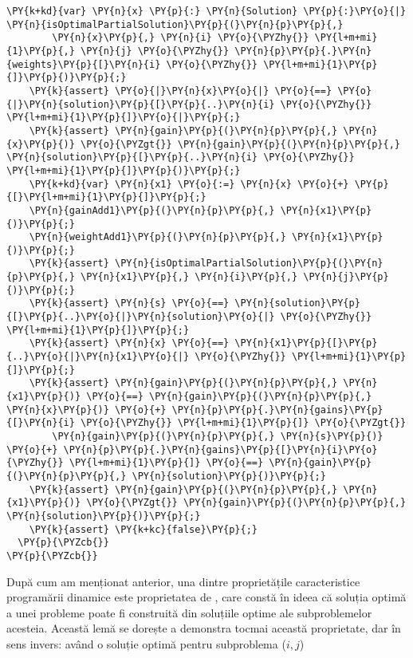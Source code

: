 \begin{sloppypar}
\begin{enumerate}
\begin{Verbatim}[commandchars=\\\{\}]
    \PY{k+kd}{var} \PY{n}{x} \PY{p}{:} \PY{n}{Solution} \PY{p}{:}\PY{o}{|} \PY{n}{isOptimalPartialSolution}\PY{p}{(}\PY{n}{p}\PY{p}{,} 
        \PY{n}{x}\PY{p}{,} \PY{n}{i} \PY{o}{\PYZhy{}} \PY{l+m+mi}{1}\PY{p}{,} \PY{n}{j} \PY{o}{\PYZhy{}} \PY{n}{p}\PY{p}{.}\PY{n}{weights}\PY{p}{[}\PY{n}{i} \PY{o}{\PYZhy{}} \PY{l+m+mi}{1}\PY{p}{]}\PY{p}{)}\PY{p}{;}
    \PY{k}{assert} \PY{o}{|}\PY{n}{x}\PY{o}{|} \PY{o}{==} \PY{o}{|}\PY{n}{solution}\PY{p}{[}\PY{p}{..}\PY{n}{i} \PY{o}{\PYZhy{}} \PY{l+m+mi}{1}\PY{p}{]}\PY{o}{|}\PY{p}{;}
    \PY{k}{assert} \PY{n}{gain}\PY{p}{(}\PY{n}{p}\PY{p}{,} \PY{n}{x}\PY{p}{)} \PY{o}{\PYZgt{}} \PY{n}{gain}\PY{p}{(}\PY{n}{p}\PY{p}{,} \PY{n}{solution}\PY{p}{[}\PY{p}{..}\PY{n}{i} \PY{o}{\PYZhy{}} \PY{l+m+mi}{1}\PY{p}{]}\PY{p}{)}\PY{p}{;}
    \PY{k+kd}{var} \PY{n}{x1} \PY{o}{:=} \PY{n}{x} \PY{o}{+} \PY{p}{[}\PY{l+m+mi}{1}\PY{p}{]}\PY{p}{;}
    \PY{n}{gainAdd1}\PY{p}{(}\PY{n}{p}\PY{p}{,} \PY{n}{x1}\PY{p}{)}\PY{p}{;}
    \PY{n}{weightAdd1}\PY{p}{(}\PY{n}{p}\PY{p}{,} \PY{n}{x1}\PY{p}{)}\PY{p}{;}
    \PY{k}{assert} \PY{n}{isOptimalPartialSolution}\PY{p}{(}\PY{n}{p}\PY{p}{,} \PY{n}{x1}\PY{p}{,} \PY{n}{i}\PY{p}{,} \PY{n}{j}\PY{p}{)}\PY{p}{;}
    \PY{k}{assert} \PY{n}{s} \PY{o}{==} \PY{n}{solution}\PY{p}{[}\PY{p}{..}\PY{o}{|}\PY{n}{solution}\PY{o}{|} \PY{o}{\PYZhy{}} \PY{l+m+mi}{1}\PY{p}{]}\PY{p}{;}
    \PY{k}{assert} \PY{n}{x} \PY{o}{==} \PY{n}{x1}\PY{p}{[}\PY{p}{..}\PY{o}{|}\PY{n}{x1}\PY{o}{|} \PY{o}{\PYZhy{}} \PY{l+m+mi}{1}\PY{p}{]}\PY{p}{;}
    \PY{k}{assert} \PY{n}{gain}\PY{p}{(}\PY{n}{p}\PY{p}{,} \PY{n}{x1}\PY{p}{)} \PY{o}{==} \PY{n}{gain}\PY{p}{(}\PY{n}{p}\PY{p}{,} \PY{n}{x}\PY{p}{)} \PY{o}{+} \PY{n}{p}\PY{p}{.}\PY{n}{gains}\PY{p}{[}\PY{n}{i} \PY{o}{\PYZhy{}} \PY{l+m+mi}{1}\PY{p}{]} \PY{o}{\PYZgt{}} 
        \PY{n}{gain}\PY{p}{(}\PY{n}{p}\PY{p}{,} \PY{n}{s}\PY{p}{)} \PY{o}{+} \PY{n}{p}\PY{p}{.}\PY{n}{gains}\PY{p}{[}\PY{n}{i}\PY{o}{\PYZhy{}} \PY{l+m+mi}{1}\PY{p}{]} \PY{o}{==} \PY{n}{gain}\PY{p}{(}\PY{n}{p}\PY{p}{,} \PY{n}{solution}\PY{p}{)}\PY{p}{;}
    \PY{k}{assert} \PY{n}{gain}\PY{p}{(}\PY{n}{p}\PY{p}{,} \PY{n}{x1}\PY{p}{)} \PY{o}{\PYZgt{}} \PY{n}{gain}\PY{p}{(}\PY{n}{p}\PY{p}{,} \PY{n}{solution}\PY{p}{)}\PY{p}{;}
    \PY{k}{assert} \PY{k+kc}{false}\PY{p}{;}
  \PY{p}{\PYZcb{}}
\PY{p}{\PYZcb{}}
\end{Verbatim}
     După cum am menționat anterior, una dintre proprietățile caracteristice programării dinamice este proprietatea de , care constă în ideea că soluția optimă a unei probleme poate fi construită din soluțiile optime ale subproblemelor acesteia. Această lemă se dorește a demonstra tocmai această proprietate, dar în sens invers: având o soluție optimă pentru subproblema ($i, j$) 

\end{enumerate}
\end{sloppypar}
